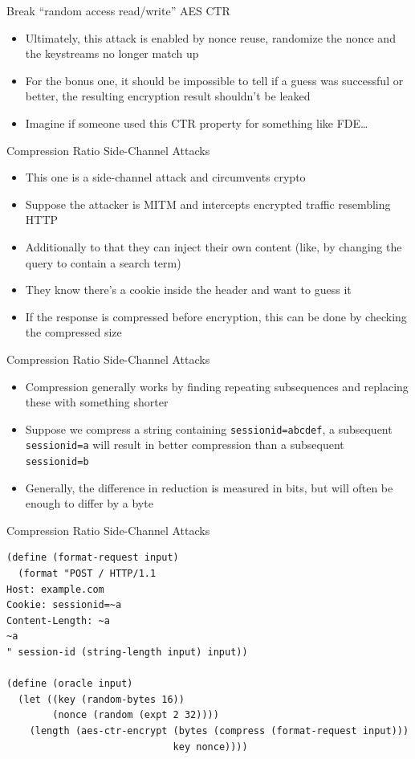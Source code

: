 \documentclass[presentation]{beamer}
\begin{document}
\begin{frame}[label=sec-2-28]{Break “random access read/write” AES CTR}
\begin{itemize}
\item Ultimately, this attack is enabled by nonce reuse, randomize the
nonce and the keystreams no longer match up
\item For the bonus one, it should be impossible to tell if a guess was
successful or better, the resulting encryption result shouldn't be
leaked
\item Imagine if someone used this CTR property for something like FDE\ldots{}
\end{itemize}
\end{frame}

\begin{frame}[label=sec-2-29]{Compression Ratio Side-Channel Attacks}
\begin{itemize}
\item This one is a side-channel attack and circumvents crypto
\item Suppose the attacker is MITM and intercepts encrypted traffic
resembling HTTP
\item Additionally to that they can inject their own content (like, by
changing the query to contain a search term)
\item They know there's a cookie inside the header and want to guess it
\item If the response is compressed before encryption, this can be done by
checking the compressed size
\end{itemize}
\end{frame}

\begin{frame}[fragile,label=sec-2-30]{Compression Ratio Side-Channel Attacks}
 \begin{itemize}
\item Compression generally works by finding repeating subsequences and
replacing these with something shorter
\item Suppose we compress a string containing \verb~sessionid=abcdef~, a
subsequent \verb~sessionid=a~ will result in better compression than a
subsequent \verb~sessionid=b~
\item Generally, the difference in reduction is measured in bits, but will
often be enough to differ by a byte
\end{itemize}
\end{frame}

\begin{frame}[fragile,label=sec-2-31]{Compression Ratio Side-Channel Attacks}
 \begin{verbatim}
(define (format-request input)
  (format "POST / HTTP/1.1
Host: example.com
Cookie: sessionid=~a
Content-Length: ~a
~a
" session-id (string-length input) input))

(define (oracle input)
  (let ((key (random-bytes 16))
        (nonce (random (expt 2 32))))
    (length (aes-ctr-encrypt (bytes (compress (format-request input)))
                             key nonce))))
\end{verbatim}
\end{frame}
\end{document}
